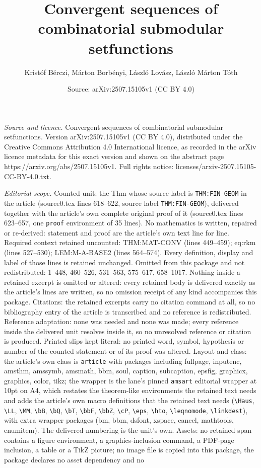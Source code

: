 \documentclass[10pt,a4paper]{amsart}
\title[Convergent sequences of combinatorial submodular setfunction]{Convergent sequences of combinatorial submodular setfunctions}
\author{Krist\'of B\'erczi, M\'arton Borb\'enyi, L\'aszl\'o Lov\'asz, L\'aszl\'o M\'arton T\'oth}
\date{Source: arXiv:2507.15105v1 (CC BY 4.0)}
\begin{document}
\maketitle

\noindent\emph{Source and licence.} Convergent sequences of combinatorial submodular setfunctions. Version arXiv:2507.15105v1 (CC BY 4.0), distributed under the Creative Commons Attribution 4.0 International licence, as recorded in the arXiv licence metadata for this exact version and shown on the abstract page https://arxiv.org/abs/2507.15105v1. Full rights notice: licenses/arxiv-2507.15105-CC-BY-4.0.txt.\par\smallskip

\noindent\textit{Editorial scope.} Counted unit: the Thm whose source label is \texttt{THM:FIN-GEOM} in the article (source0.tex lines 618--622, source label \texttt{THM:FIN-GEOM}), delivered together with the article's own complete original proof of it (source0.tex lines 623--657, one \texttt{proof} environment of 35 lines). No mathematics is written, repaired or re-derived: statement and proof are the article's own text line for line. Required context retained uncounted: THM:MAT-CONV (lines 449--459); eq:rkm (lines 527--530); LEM:M-A-BASE2 (lines 564--574). Every definition, display and label of those lines is retained unchanged. Omitted from this package and not redistributed: 1--448, 460--526, 531--563, 575--617, 658--1017. Nothing inside a retained excerpt is omitted or altered: every retained body is delivered exactly as the article's lines are written, so no omission receipt of any kind accompanies this package. Citations: the retained excerpts carry no citation command at all, so no bibliography entry of the article is transcribed and no reference is redistributed. Reference adaptation: none was needed and none was made; every reference inside the delivered unit resolves inside it, so no unresolved reference or citation is produced. Printed slips kept literal: no printed word, symbol, hypothesis or number of the counted statement or of its proof was altered. Layout and class: the article's own class is \texttt{article} with packages including fullpage, inputenc, amsthm, amssymb, amsmath, bbm, soul, caption, subcaption, epsfig, graphicx, graphics, color, tikz; the wrapper is the lane's pinned \texttt{amsart} editorial wrapper at 10pt on A4, which restates the theorem-like environments the retained text needs and adds the article's own macro definitions that the retained text needs (\texttt{\textbackslash Haus}, \texttt{\textbackslash LL}, \texttt{\textbackslash MM}, \texttt{\textbackslash bB}, \texttt{\textbackslash bQ}, \texttt{\textbackslash bT}, \texttt{\textbackslash bbF}, \texttt{\textbackslash bbZ}, \texttt{\textbackslash cP}, \texttt{\textbackslash eps}, \texttt{\textbackslash hto}, \texttt{\textbackslash leqnomode}, \texttt{\textbackslash linkdest}), with extra wrapper packages (bm, bbm, dsfont, xspace, cancel, mathtools, enumitem). The delivered numbering is the unit's own. Assets: no retained span contains a figure environment, a graphics-inclusion command, a PDF-page inclusion, a table or a TikZ picture; no image file is copied into this package, the package declares no asset dependency and no 
\end{document}
